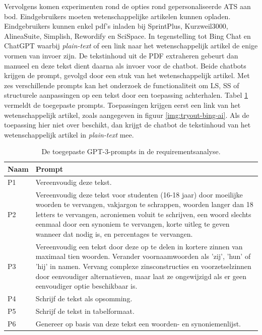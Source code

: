 \medspace

Vervolgens komen experimenten rond de opties rond gepersonaliseerde ATS aan bod. Eindgebruikers moeten wetenschappelijke artikelen kunnen opladen. Eindgebruikers kunnen enkel pdf's inladen bij SprintPlus, Kurzweil3000, AlineaSuite, Simplish, Rewordify en SciSpace. In tegenstelling tot Bing Chat en ChatGPT waarbij \textit{plain-text} of een link naar het wetenschappelijk artikel de enige vormen van invoer zijn. De tekstinhoud uit de PDF extraheren gebeurt dan manueel en deze tekst dient daarna als invoer voor de chatbot. Beide chatbots krijgen de prompt, gevolgd door een stuk van het wetenschappelijk artikel. Met zes verschillende prompts kan het onderzoek de functionaliteit om LS, SS of structurele aanpassingen op een tekst door een toepassing achterhalen. Tabel \ref{table:tested-prompts-requirementsanalysis} vermeldt de toegepaste prompts. Toepassingen krijgen eerst een link van het wetenschappelijk artikel, zoals aangegeven in figuur \ref{img:tryout-bing-ai}. Als de toepassing hier niet over beschikt, dan krijgt de chatbot de tekstinhoud van het wetenschappelijk artikel in \textit{plain-text} mee. 

\begin{center}
	\begin{table}[H]
		\begin{tabular}{ | m{2cm} | m{14cm} | } 
			\hline
			\textbf{Naam} & \textbf{Prompt} \\
			\hline
			P1 & Vereenvoudig deze tekst. \\
			\hline
			P2 & Vereenvoudig deze tekst voor studenten (16-18 jaar) door moeilijke woorden te vervangen, vakjargon te schrappen, woorden langer dan 18 letters te vervangen, acroniemen voluit te schrijven, een woord slechts eenmaal door een synoniem te vervangen, korte uitleg te geven wanneer dat nodig is, en percentages te vervangen. \\
			\hline
			P3 & Vereenvoudig een tekst door deze op te delen in kortere zinnen van maximaal tien woorden. Verander voornaamwoorden als 'zij', 'hun' of 'hij' in namen. Vervang complexe zinsconstructies en voorzetselzinnen door eenvoudiger alternatieven, maar laat ze ongewijzigd als er geen eenvoudiger optie beschikbaar is. \\
			\hline
			P4 & Schrijf de tekst als opsomming. \\
			\hline
			P5 & Schrijf de tekst in tabelformaat. \\
			\hline
			P6 & Genereer op basis van deze tekst een woorden- en synoniemenlijst. \\
			\hline
		\end{tabular}
		\caption{De toegepaste GPT-3-prompts in de requirementsanalyse.}
		\label{table:tested-prompts-requirementsanalysis}
	\end{table}
\end{center}

